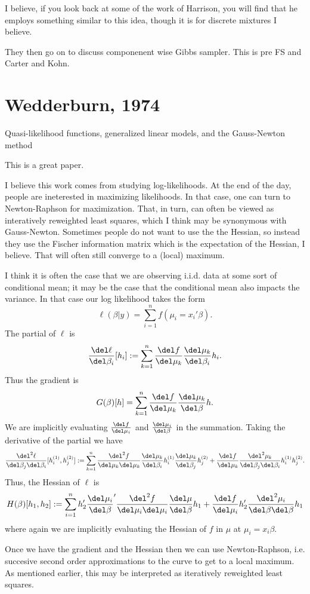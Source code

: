 \documentclass{article}
\newcommand{\graddel}[2]{\frac{\del #1}{\del #2}}
\newcommand{\hessdel}[3]{\frac{\del^2 #1}{\del #2 \del #3}}
\begin{document}
I believe, if you look back at some of the work of Harrison, you will find that
he employs something similar to this idea, though it is for discrete mixtures I
believe.

They then go on to discuss componenent wise Gibbs sampler.  This is pre FS and
Carter and Kohn.

\section{Wedderburn, 1974}

Quasi-likelihood functions, generalized linear models, and the Gauss-Newton method

This is a great paper.

I believe this work comes from studying log-likelihoods.  At the end of the day,
people are ineterested in maximizing likelihoods.  In that case, one can turn to
Newton-Raphson for maximization.  That, in turn, can often be viewed as
interatively reweighted least squares, which I think may be synonymous with
Gauss-Newton.  Sometimes people do not want to use the the Hessian, so instead
they use the Fischer information matrix which is the expectation of the Hessian,
I believe.  That will often still converge to a (local) maximum.

I think it is often the case that we are observing i.i.d. data at some sort of
conditional mean; it may be the case that the conditional mean also impacts the
variance.  In that case our log likelihood takes the form
\[
\ell(\beta | y) = \sum_{i=1}^n f(\mu_i = x_i' \beta).
\]
The partial of $\ell$ is
\[
\graddel{\ell}{\beta_i}[h_i]:= \sum_{k=1}^n \graddel{f}{\mu_k}
\graddel{\mu_k}{\beta_i} h_i.
\]
Thus the gradient is
\[
G(\beta)[h] = \sum_{k=1}^n \graddel{f}{\mu_k}
\graddel{\mu_k}{\beta} h.
\]
We are implicitly evaluating $\graddel{f}{\mu_i}$ and $\graddel{\mu_i}{\beta}$ in
the summation.  Taking the derivative of the partial we have
\[
\hessdel{\ell}{\beta_j}{\beta_i}[h_i^{(1)}, h_j^{(2)}]:= \sum_{k=1}^n
\hessdel{f}{\mu_k}{\mu_k} \graddel{\mu_k}{\beta_i} h_i^{(1)}
\graddel{\mu_k}{\beta_j} h_j^{(2)} + \graddel{f}{\mu_k}
\hessdel{\mu_k}{\beta_j}{\beta_i} h_i^{(1)} h_j^{(2)}.
\]
Thus, the Hessian of $\ell$ is
\[
H(\beta)[h_1, h_2] := 
\sum_{i=1}^n h_2' 
\graddel{\mu_i}{\beta}' \hessdel{f}{\mu_i}{\mu_i}\graddel{\mu}{\beta} h_1 
+ \graddel{f}{\mu_i} h_2' \hessdel{\mu_i}{\beta}{\beta} h_1
\]
where again we are implicitly evaluating the Hessian of $f$ in $\mu$ at $\mu_i =
x_i \beta$.

Once we have the gradient and the Hessian then we can use Newton-Raphson,
i.e. succesive second order approximations to the curve to get to a local
maximum.  As mentioned earlier, this may be interpreted as iteratively
reweighted least squares.  
\end{document}
